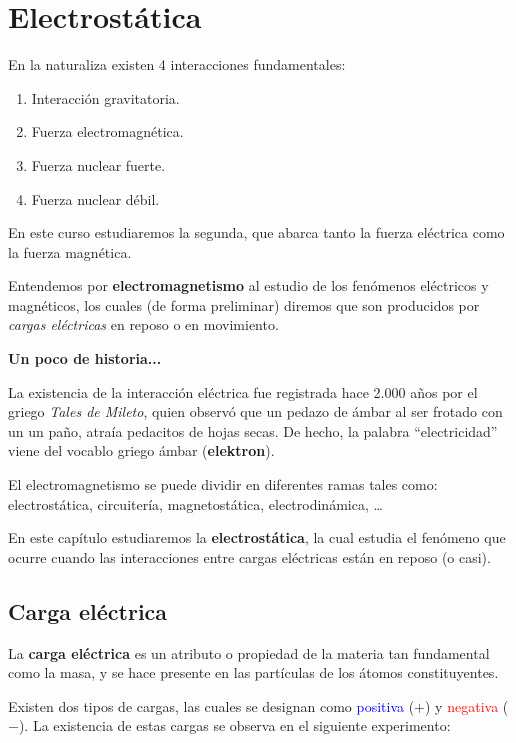 \chapter{Electrostática}

En la naturaliza existen 4 interacciones fundamentales:
\begin{enumerate}
\item Interacción gravitatoria.
\item Fuerza electromagnética.
\item Fuerza nuclear fuerte.
\item Fuerza nuclear débil.
\end{enumerate}

En este curso estudiaremos la segunda, que abarca tanto la fuerza eléctrica como la fuerza magnética.  

Entendemos por \textbf{electromagnetismo} al estudio de los fenómenos eléctricos y magnéticos, los cuales (de forma preliminar) diremos que son producidos por \textit{cargas eléctricas} en reposo o en movimiento.


\textbf{Un poco de historia...}

La existencia de la interacción eléctrica fue registrada hace 2.000 años por el griego \textit{Tales de Mileto}, quien observó que un pedazo de ámbar al ser frotado con un un paño, atraía pedacitos de hojas secas. De hecho, la palabra “electricidad” viene del vocablo griego ámbar  (\textbf{elektron}).


El electromagnetismo se puede dividir en diferentes ramas tales como: electrostática, circuitería, magnetostática, electrodinámica, \dots

En este capítulo estudiaremos la \textbf{electrostática}, la cual estudia el fenómeno que ocurre cuando las interacciones entre cargas eléctricas están en reposo (o casi).

\section{Carga eléctrica} 

La \textbf{carga eléctrica} es un atributo o propiedad de la materia tan fundamental como la masa, y se hace presente en las partículas  de los átomos constituyentes. 

Existen dos tipos de cargas, las cuales se designan como \textcolor{blue}{positiva} ($+$) y \textcolor{red}{negativa} ($-$). La existencia de estas cargas se observa en el siguiente experimento:

